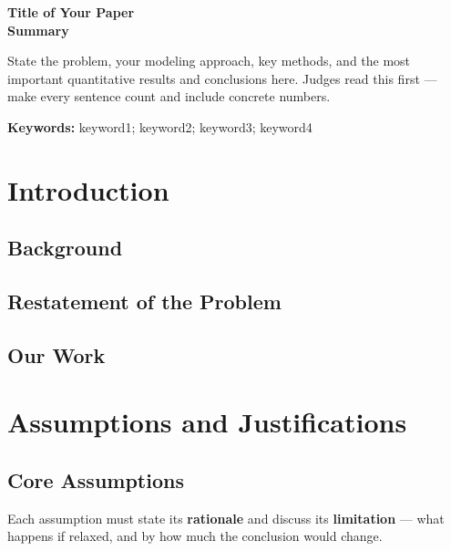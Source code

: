\documentclass[12pt]{article}
\begin{document}
\begin{center}
  {\Large\textbf{Title of Your Paper}}\\[0.5em]
  \textbf{Summary}
\end{center}

\small  %
\noindent
State the problem, your modeling approach, key methods, and the most important
quantitative results and conclusions here. Judges read this first --- make every
sentence count and include concrete numbers.

\bigskip
\noindent\textbf{Keywords:} keyword1; keyword2; keyword3; keyword4

\newpage

\setcounter{tocdepth}{2}       %
\tableofcontents
\newpage

\section{Introduction}
\subsection{Background}
\subsection{Restatement of the Problem}
\subsection{Our Work}
\FloatBarrier

\section{Assumptions and Justifications}

\subsection{Core Assumptions}
Each assumption must state its \textbf{rationale} and discuss its \textbf{limitation}
--- what happens if relaxed, and by how much the conclusion would change.
\end{document}
